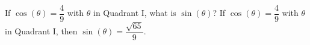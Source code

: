 {If $\cos(\theta) = \dfrac{4}{9}$ with $\theta$ in Quadrant I, what is $\sin(\theta)$?}
{If $\cos(\theta) = \dfrac{4}{9}$ with $\theta$ in Quadrant I, then $\sin(\theta) = \dfrac{\sqrt{65}}{9}$.}